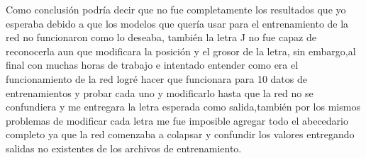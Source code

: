 \documentclass[10pt]{article}         %
\begin{document}
Como conclusión podría decir que no fue completamente los resultados que yo esperaba debido a que los modelos que  quería usar para el entrenamiento de la red no funcionaron como lo deseaba, también la letra J no fue capaz de reconocerla aun que modificara la posición y el grosor de la letra, sin embargo,al final con muchas horas de trabajo e intentado entender como era el funcionamiento de la red logré hacer que funcionara para 10 datos de entrenamientos y probar cada uno y modificarlo hasta que la red no se confundiera y me entregara la letra esperada como salida,también por los mismos problemas de modificar cada letra me fue imposible agregar todo el abecedario completo ya que la red comenzaba a colapsar y confundir los valores entregando salidas no existentes de los archivos de entrenamiento.




	
\end{document}

